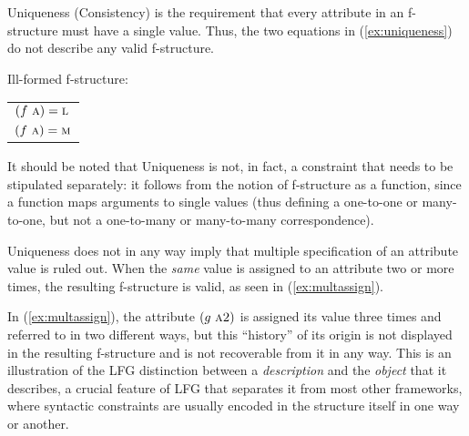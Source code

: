 \documentclass[output=paper,hidelinks]{langscibook}
\begin{document}
 
 Uniqueness (Consistency) is the requirement that every attribute in an f-struc\-ture must have a single value. Thus, the two equations in (\ref{ex:uniqueness}) do not describe any valid f-structure.

 \begin{exe}
 \ex\label{ex:uniqueness}Ill-formed f-structure:\\[1ex]
 \begin{tabular}{l}
  $(f~\textsc{a}) = \textsc{l}$\\
  $(f~\textsc{a}) = \textsc{m}$\\
 \end{tabular} \qquad
 \end{exe}
It should be noted that Uniqueness is not, in fact, a constraint that needs to be stipulated separately: it follows from the notion of f-structure as a function, since a function maps arguments to single values (thus defining a one-to-one or many-to-one, but not a one-to-many or many-to-many correspondence).
 
 
 Uniqueness does not in any way imply that multiple specification of an attribute value is ruled out. When the \textit{same} value is assigned to an attribute two or more times, the resulting f-structure is valid, as seen in (\ref{ex:multassign}).
 
\begin{exe}
 \ex\label{ex:multassign}
\end{exe}
In (\ref{ex:multassign}), the attribute $(g~\textsc{a2})$ is assigned its value three times and referred to in two different ways, but this ``history'' of its origin is not displayed in the resulting f-structure and is not recoverable from it in any way. This is an illustration of the LFG distinction between a \textit{description} and the \textit{object} that it describes, a crucial feature of LFG that separates it from most other frameworks, where syntactic constraints are usually encoded in the structure itself in one way or another.
 
\end{document}

